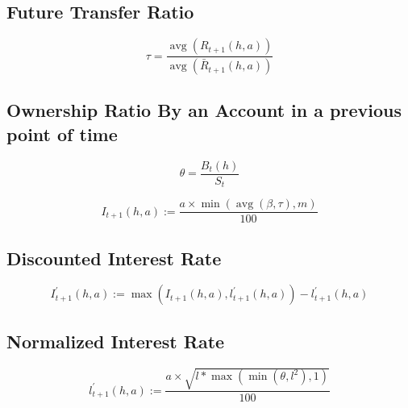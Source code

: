 \begin{tcolorbox}
\subsection{ Future Transfer Ratio }
\begin{equation}
\tau=\frac{\operatorname{avg}\left(R_{t+1}(h, a)\right)}{\operatorname{avg}\left(\bar{R}_{t+1}(h, a)\right)}
\end{equation}
\end{tcolorbox}

\begin{tcolorbox}
\subsection{ Ownership Ratio By an Account in a previous point of time }
\begin{equation}
\theta=\frac{B_{t}(h)}{S_{t}}
\end{equation}
\end{tcolorbox}

\begin{tcolorbox}
\label{Interest Rate}
\begin{equation}
I_{t+1}(h, a):=\frac{a \times \min (\operatorname{avg}(\beta, \tau), m)}{100}
\end{equation}
\end{tcolorbox}

\begin{tcolorbox}
\subsection{Discounted Interest Rate}
\label{Discounted Interest Rate}
\begin{equation}
I_{t+1}^{\prime}(h, a):=\max \left(I_{t+1}(h, a), l_{t+1}^{\prime}(h, a)\right)-l_{t+1}^{\prime}(h, a)
\end{equation}
\end{tcolorbox}


\begin{tcolorbox}
\subsection{Normalized Interest Rate}
\label{Normalized Interest Rate }
\begin{equation}
l_{t+1}^{\prime}(h, a):=\frac{a \times \sqrt{l * \max \left(\min \left(\theta, l^{2}\right), 1\right)}}{100}
\end{equation}
\end{tcolorbox}



